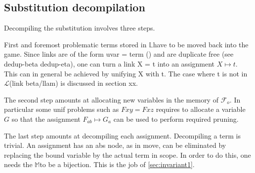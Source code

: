 \documentclass[sigconf,natbib=false,review]{acmart}
\newcommand{\UnifRel}{\ensuremath{\simeq}}
\newcommand{\Ue}{\ensuremath{\UnifRel_\lambda}\xspace}
\newcommand{\llambda}{\ensuremath{\mathcal{L}}\xspace}
\newcommand{\Fo}{\texorpdfstring{\ensuremath{\mathcal{F}_{\!o}\xspace}}{Fo}} %
\newcommand{\linkStore}{\texorpdfstring{\ensuremath{\mathbb{L}}\xspace}{L}}
\newcommand{\mapStore}{\texorpdfstring{\ensuremath{\mathbb{M}}\xspace}{M}}
\begin{document}
\subsection{Substitution decompilation}

Decompiling the substitution involves three steps.

First and foremost problematic terms stored in
\linkStore have to be moved back into the game.
Since links are of the form uvar = term ()
and are duplicate free (see dedup-beta dedup-eta),
one can turn a link X = t into an assignment $X \mapsto t$.
This can in general be achieved by unifying X with t. The case
where t is not in \llambda (link beta/llam) is discussed in section xx.

The second step amounts at allocating new variables in the
memory of \Fo{}. In particular some unif problems
such as $F x y = F x z$ requires to allocate a 
variable $G$ so that the assignment
$F_{ab} \mapsto G_a$ can be used to perform
required pruning.

The last step amounts at decompiling each assignment.
Decompiling a term is trivial. An assignment has an
abs node, as in move, can be eliminated by replacing
the bound variable by the actual term in scope.
In order to do this, one needs the \mapStore to be
a bijection. This is the job of \cref{sec:invariant1}.


%



% 

\end{document}
